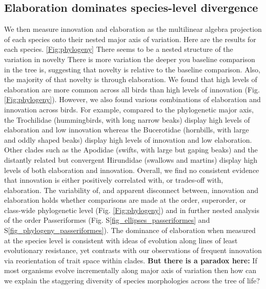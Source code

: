 \documentclass[12pt,letterpaper]{article}
\begin{document}
\subsection{Elaboration dominates species-level divergence}
We then measure innovation and elaboration as the multilinear algebra projection of each species onto their nested major axis of variation.
Here are the results for each species. \ref{Fig:phylogeny}
There seems to be a nested structure of the variation in novelty %
There is more variation the deeper you baseline comparison in the tree is, suggesting that novelty is relative to the baseline comparison.
Also, the majority of that novelty is through elaboration.
We found that high levels of elaboration are more common across all birds than high levels of innovation (Fig. \ref{Fig:phylogeny}).
However, we also found various combinations of elaboration and innovation across birds.
For example, compared to the phylogenetic major axis, the Trochilidae (hummingbirds, with long narrow beaks) display high levels of elaboration and low innovation whereas the Bucerotidae (hornbills, with large and oddly shaped beaks) display high levels of innovation and low elaboration.
Other clades such as the Apodidae (swifts, with large but gaping beaks) and the distantly related but convergent Hirundidae (swallows and martins) display high levels of both elaboration and innovation.
Overall, we find no consistent evidence that innovation is either positively correlated with, or trades-off with, elaboration. %
The variability of, and apparent disconnect between, innovation and elaboration holds whether comparisons are made at the order, superorder, or class-wide phylogenetic level (Fig. \ref{Fig:phylogeny})%
 and in further nested analysis of the order Passeriformes (Fig. S\ref{fig_ellipses_passeriformes} and S\ref{fig_phylogeny_passeriformes}).
The dominance of elaboration when measured at the species level is consistent with ideas of evolution along lines of least evolutionary resistance, yet contrasts with our observations of frequent innovation via reorientation of trait space within clades.
\textbf{But there is a paradox here:}
If most organisms evolve incrementally along major axis of variation then how can we explain the staggering diversity of species morphologies across the tree of life?
\end{document}
